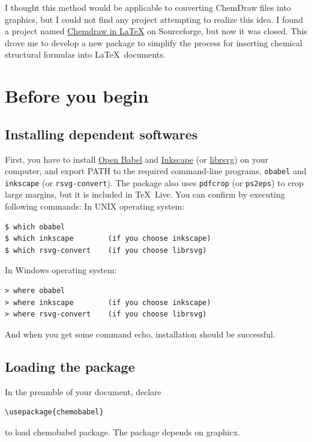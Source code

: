 \documentclass[12pt]{ltjsarticle}
\def\Lpack#1{\textsf{#1}}
\def\Lcode#1{\texttt{#1}}
\begin{document}
I thought this method would be applicable to converting ChemDraw files into
graphics, but I could not find any project attempting to realize this idea.
I found a project named
\href{http://chemdrawinlatex.sourceforge.net/}{Chemdraw in \LaTeX}
on Sourceforge, but now it was closed.
This drove me to develop a new package to simplify the process for
inserting chemical structural formulas into \LaTeX\ documents.


\clearpage

\section{Before you begin}

\subsection{Installing dependent softwares}

First, you have to install \href{http://openbabel.org/}{Open Babel} and
\href{https://inkscape.org/en/}{Inkscape}
(or \href{http://librsvg.sourceforge.net/download/}{librsvg}) on your
computer, and export PATH to the required command-line programs,
\Lcode{obabel} and \Lcode{inkscape} (or \Lcode{rsvg-convert}).
The package also uses \Lcode{pdfcrop} (or \Lcode{ps2eps}) to
crop large margins, but it is included in \TeX\ Live.
You can confirm by executing following commands:
In UNIX operating system:
\begin{verbatim}
$ which obabel
$ which inkscape        (if you choose inkscape)
$ which rsvg-convert    (if you choose librsvg)
\end{verbatim}

In Windows operating system:
\begin{verbatim}
> where obabel
> where inkscape        (if you choose inkscape)
> where rsvg-convert    (if you choose librsvg)
\end{verbatim}

And when you get some command echo, installation should be successful.

\subsection{Loading the package}

In the preamble of your document, declare
\begin{verbatim}
\usepackage{chemobabel}
\end{verbatim}
to load \Lpack{chemobabel} package.
The package depends on \Lpack{graphicx}.
\end{document}
